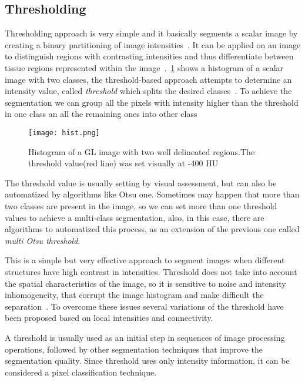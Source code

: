 \documentclass{standalone}
\begin{document}
\subsection{Thresholding}

	Thresholding approach is very simple and it basically segments a scalar image by creating a binary partitioning of image intensities~\cite{ART:Pham}. It can be applied on an image to distinguish regions with contrasting intensities and thus differentiate between tissue regions represented within the image~\cite{INP:Withey}. \figurename\,\ref{fig:Histogram} shows a histogram of a scalar image with two classes, the threshold-based approach attempts to determine an intensity value, called \emph{threshold} which splits the desired classes~\cite{ART:Pham}. To achieve the segmentation we can group all the pixels with intensity higher than the threshold in one class an all the remaining ones into other class

	\begin{figure}[h!]
		\centering
			\texttt{[image: hist.png]}
		\caption{Histogram of a GL image with two well delineated regions.The threshold value(red line) was set visually at -400 HU}\label{fig:Histogram}
	\end{figure}

	The threshold value is usually setting by visual assessment, but can also be automatized by algorithms like Otsu one.
	Sometimes may happen that more than two classes are present in the image, so we can set more than one threshold values to achieve a multi-class segmentation, also, in this case, there are algorithms to automatized this process, as an extension of the previous one called \emph{multi Otsu threshold}.

	This is a simple but very effective approach to segment images when different structures have high contrast in intensities. Threshold does not take into account the spatial characteristics of the image, so it is sensitive to noise and intensity inhomogeneity, that corrupt the image histogram and make difficult the separation~\cite{ART:Pham}. To overcome these issues several variations of the threshold have been proposed based on local intensities and connectivity.

	A threshold is usually used as an initial step in sequences of image processing operations, followed by other segmentation techniques that improve the segmentation quality. 
Since threshold uses only intensity information, it can be considered a pixel classification technique.
\end{document}
